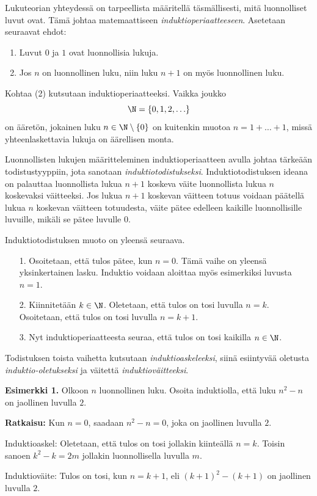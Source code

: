 Lukuteorian yhteydessä on tarpeellista määritellä täsmällisesti, mitä luonnolliset luvut ovat. Tämä johtaa matemaattiseen {\em induktioperiaatteeseen}. Asetetaan seuraavat ehdot:
\begin{enumerate}
\item Luvut $0$ ja $1$ ovat luonnollisia lukuja.
\item Jos $n$ on luonnollinen luku, niin luku $n+1$ on myös luonnollinen luku.
\end{enumerate}
Kohtaa (2) kutsutaan induktioperiaatteeksi. Vaikka joukko
\[
\N = \{0,1,2,\ldots\}
\]
on ääretön, jokainen luku $n\in \N\setminus \{0\}$ on kuitenkin muotoa $n=1+\ldots + 1$, missä yhteenlaskettavia lukuja on äärellisen monta.

Luonnollisten lukujen määritteleminen induktioperiaatteen avulla johtaa tärkeään todistustyyppiin, jota sanotaan {\em induktiotodistukseksi}. Induktiotodistuksen ideana on palauttaa luonnollista lukua $n+1$ koskeva väite luonnollista lukua $n$ koskevaksi väitteeksi. Jos lukua $n+1$ koskevan väitteen totuus voidaan päätellä lukua $n$ koskevan väitteen totuudesta, väite pätee  edelleen kaikille luonnollisille luvuille, mikäli se pätee luvulle $0$. 

Induktiotodistuksen muoto on yleensä seuraava.
\begin{itemize}
\item[1.] Osoitetaan, että tulos pätee, kun $n=0$. Tämä vaihe on yleensä yksinkertainen lasku. Induktio voidaan aloittaa myös esimerkiksi luvusta $n=1$.
\item[2.] Kiinnitetään $k\in \N$. Oletetaan, että tulos on tosi luvulla $n=k$. Osoitetaan, että tulos on tosi luvulla $n=k+1$.
\item[3.] Nyt induktioperiaatteesta seuraa, että tulos on tosi kaikilla $n\in \N$.
\end{itemize}
Todistuksen toista vaihetta kutsutaan {\em induktioaskeleeksi}, siinä esiintyvää oletusta {\em induktio-oletukseksi} ja väitettä {\em induktioväitteeksi}.

{\bf Esimerkki 1.} Olkoon $n$ luonnollinen luku. Osoita induktiolla, että luku $n^2-n$ on jaollinen luvulla $2$.

{\bf Ratkaisu:} 
Kun $n=0$, saadaan $n^2-n=0$, joka on jaollinen luvulla $2$.

Induktioaskel: Oletetaan, että tulos on tosi jollakin kiinteällä $n=k$. Toisin sanoen $k^2-k=2m$ jollakin luonnollisella luvulla $m$. 

Induktioväite: Tulos on tosi, kun $n=k+1$, eli $(k+1)^2-(k+1)$ on jaollinen luvulla $2$.

